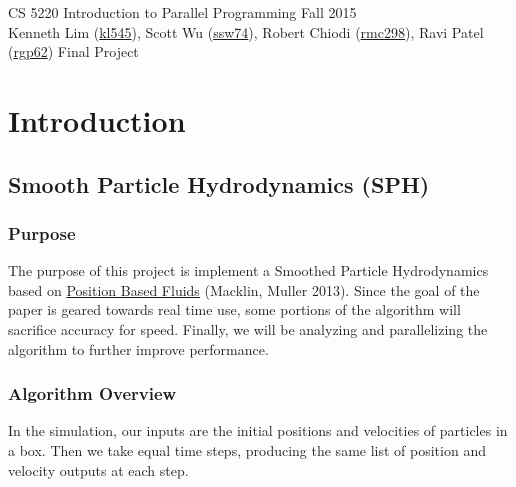 \documentclass{scrartcl}
\begin{document}
    \begin{framed}
    CS 5220 Introduction to Parallel Programming \hfill Fall 2015 \\
    Kenneth Lim (\href{mailto:kl545@cornell.edu}{kl545}), Scott Wu (\href{mailto:ssw74@cornell.edu}{ssw74}), Robert Chiodi (\href{mailto:rmc298@cornell.edu}{rmc298}), Ravi Patel (\href{mailto:rgp62@cornell.edu}{rgp62})  \hfill Final Project \hspace{-3ex}
    \end{framed}


    \section{Introduction}

    \subsection{Smooth Particle Hydrodynamics (SPH)}

    \subsubsection{Purpose}

    The purpose of this project is implement a Smoothed Particle Hydrodynamics based on \href{http://mmacklin.com/pbf_sig_preprint.pdf}{Position Based Fluids} (Macklin, Muller 2013). Since the goal of the paper is geared towards real time use, some portions of the algorithm will sacrifice accuracy for speed. Finally, we will be analyzing and parallelizing the algorithm to further improve performance.

    \subsubsection{Algorithm Overview}

    In the simulation, our inputs are the initial positions and velocities of particles in a box. Then we take equal time steps, producing the same list of position and velocity outputs at each step.
\end{document}
